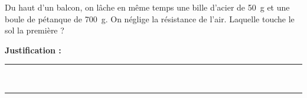 Du haut d'un balcon, on lâche en même temps une bille d'acier de \qty{50}{g} et une boule de pétanque de \qty{700}{g}. On néglige la résistance de l'air. Laquelle touche le sol la première ?

\choices

\noindent\textbf{Justification :} \hrulefill \\[2.5ex]
\rule{\linewidth}{0.4pt} \\[2.5ex]
\rule{\linewidth}{0.4pt}
\vfill
